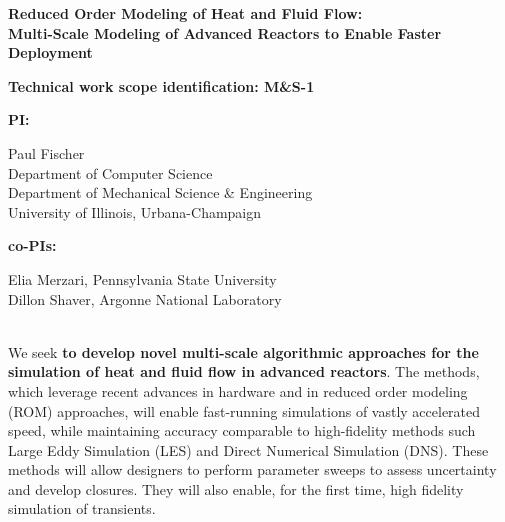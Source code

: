 \parindent 0in
\parskip 0.1in

\begin{center}
{\bf Reduced Order Modeling of Heat and Fluid Flow: \\
Multi-Scale Modeling of Advanced Reactors to Enable Faster Deployment}
\\[-7ex]
\end{center}

{\bf Technical work scope identification: M\&S-1 }

{\bf PI: }\begin{minipage}[t]{5in}
Paul Fischer \\
Department of Computer Science \\
Department of Mechanical Science \& Engineering \\
University of Illinois, Urbana-Champaign \\[-2ex]
\end{minipage}

{\bf co-PIs: } \begin{minipage}[t]{5in}
Elia Merzari, Pennsylvania State University \\
Dillon Shaver, Argonne National Laboratory \\[-1ex]
\end{minipage}

 \\[-4ex]


We seek \textbf{to develop novel multi-scale algorithmic approaches for the
simulation of heat and fluid flow in advanced reactors}. The methods, which
leverage recent advances in hardware and in reduced order modeling (ROM)
approaches, will enable fast-running simulations of vastly accelerated speed,
while maintaining accuracy comparable to high-fidelity methods such Large Eddy
Simulation (LES) and Direct Numerical Simulation (DNS). These methods will
allow designers to perform
parameter sweeps to assess uncertainty and develop closures. They will also
enable, for the first time, high fidelity simulation of transients.

